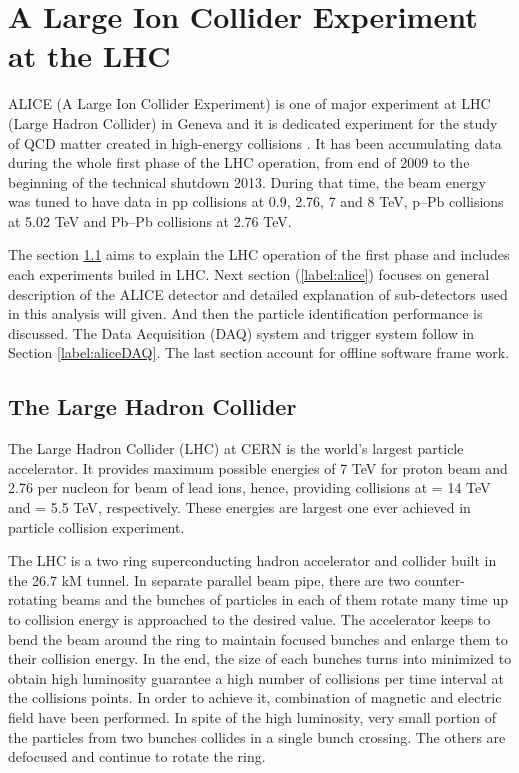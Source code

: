 \newpage
\section{A Large Ion Collider Experiment at the LHC}

ALICE (A Large Ion Collider Experiment) is one of major experiment at LHC (Large Hadron Collider) in Geneva and it is dedicated experiment for the study of QCD matter created in high-energy collisions \cite{cite:ALICEPerformance}. It has been accumulating data during the whole first phase of the LHC operation, from end of 2009 to the beginning of the technical shutdown 2013. During that time, the beam energy was tuned to have data in pp collisions at 0.9, 2.76, 7 and 8 TeV, p--Pb collisions at 5.02 TeV and Pb--Pb collisions at 2.76 TeV.

The section \ref{label:lhc} aims to explain the LHC operation of the first phase and includes each experiments builed in LHC. Next section (\ref{label:alice}) focuses on general description of the ALICE detector and detailed explanation of sub-detectors used in this analysis will given. And then the particle identification performance is discussed. The Data Acquisition (DAQ) system and trigger system follow in Section \ref{label:aliceDAQ}. The last section account for offline software frame work.


\subsection{The Large Hadron Collider}\label{label:lhc}
The Large Hadron Collider (LHC) \cite{cite:LHC} at CERN is the world's largest particle accelerator. It provides maximum possible energies of 7 TeV for proton beam and 2.76 per nucleon for beam of lead ions, hence, providing collisions at \s = 14 TeV and \snn = 5.5 TeV, respectively. These energies are largest one ever achieved in particle collision experiment. 

The LHC is a two ring superconducting hadron accelerator and collider built in the 26.7 kM tunnel. 
In separate parallel beam pipe, there are two counter-rotating beams and the bunches of particles in each of them rotate many time up to collision energy is approached to the desired value. The accelerator keeps to bend the beam around the ring to maintain focused bunches and enlarge them to their collision energy.
In the end, the size of each bunches turns into minimized to obtain high luminosity guarantee a high number of collisions per time interval at the collisions points. 
In order to achieve it, combination of magnetic and electric field have been performed. In spite of the high luminosity, very small portion of the particles from two bunches collides in a single bunch crossing. The others are defocused and continue to rotate the ring.
   
